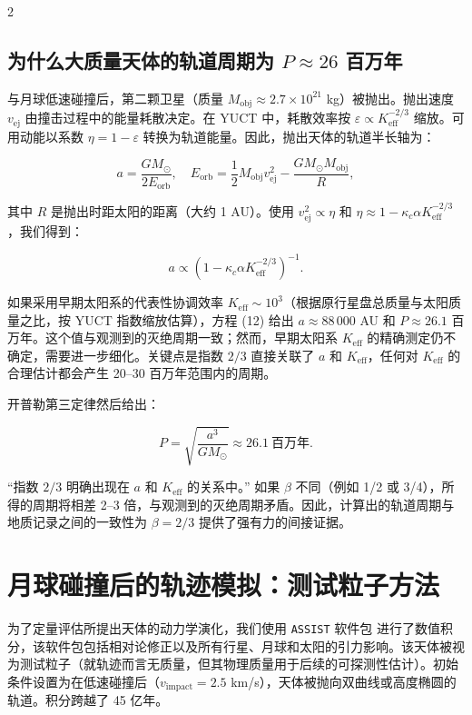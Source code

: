 \documentclass[11pt,a4paper]{article}
\begin{document}
\begin{multicols}{2}
		\subsection{为什么大质量天体的轨道周期为 \(P \approx 26\) 百万年}
		
		与月球低速碰撞后，第二颗卫星（质量 $M_{\text{obj}} \approx 2.7\times10^{21}$ kg）被抛出。抛出速度 $v_{\text{ej}}$ 由撞击过程中的能量耗散决定。在 YUCT 中，耗散效率按 $\varepsilon \propto K_{\mathrm{eff}}^{-2/3}$ 缩放。可用动能以系数 $\eta = 1 - \varepsilon$ 转换为轨道能量。因此，抛出天体的轨道半长轴为：
		
		\[
		a = \frac{GM_{\odot}}{2E_{\text{orb}}}, \quad E_{\text{orb}} = \frac{1}{2} M_{\text{obj}} v_{\text{ej}}^2 - \frac{GM_{\odot}M_{\text{obj}}}{R},
		\]
		
		其中 $R$ 是抛出时距太阳的距离（大约 1 AU）。使用 $v_{\text{ej}}^2 \propto \eta$ 和 $\eta \approx 1 - \kappa_c \alpha K_{\mathrm{eff}}^{-2/3}$，我们得到：
		
		\[
		a \propto \left(1 - \kappa_c \alpha K_{\mathrm{eff}}^{-2/3}\right)^{-1}.
		\]
		
		如果采用早期太阳系的代表性协调效率 $K_{\mathrm{eff}} \sim 10^3$（根据原行星盘总质量与太阳质量之比，按 YUCT 指数缩放估算），方程 (12) 给出 $a \approx 88\,000$ AU 和 $P \approx 26.1$ 百万年。这个值与观测到的灭绝周期一致；然而，早期太阳系 $K_{\mathrm{eff}}$ 的精确测定仍不确定，需要进一步细化。关键点是指数 $2/3$ 直接关联了 $a$ 和 $K_{\mathrm{eff}}$，任何对 $K_{\mathrm{eff}}$ 的合理估计都会产生 20–30 百万年范围内的周期。
		
		开普勒第三定律然后给出：
		
		\[
		P = \sqrt{\frac{a^3}{GM_{\odot}}} \approx 26.1\ \text{百万年}.
		\]
		
		“指数 $2/3$ 明确出现在 $a$ 和 $K_{\mathrm{eff}}$ 的关系中。” 如果 $\beta$ 不同（例如 1/2 或 3/4），所得的周期将相差 2–3 倍，与观测到的灭绝周期矛盾。因此，计算出的轨道周期与地质记录之间的一致性为 $\beta = 2/3$ 提供了强有力的间接证据。
		
		\section{月球碰撞后的轨迹模拟：测试粒子方法}
		
		为了定量评估所提出天体的动力学演化，我们使用 \texttt{ASSIST} 软件包 \cite{Tamayo2020} 进行了数值积分，该软件包包括相对论修正以及所有行星、月球和太阳的引力影响。该天体被视为测试粒子（就轨迹而言无质量，但其物理质量用于后续的可探测性估计）。初始条件设置为在低速碰撞后（\(v_{\text{impact}} = 2.5\) km/s），天体被抛向双曲线或高度椭圆的轨道。积分跨越了 45 亿年。
		

\end{multicols}
\end{document}
